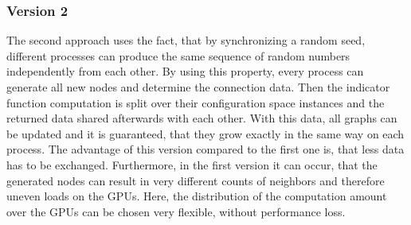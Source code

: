 \documentclass[twocolumn]{svjour3}
\begin{document}
\subsubsection*{Version 2}
The second approach uses the fact, that by synchronizing a random seed, 
different processes can produce the same sequence of random numbers independently from each other.
By using this property, every process can generate all new nodes and determine the connection data. 
Then the indicator function computation is split over their configuration space instances and the returned data shared afterwards with each other.
With this data, all graphs can be updated and it is guaranteed, that they grow exactly in the same way on each process.
The advantage of this version compared to the first one is, that less data has to be exchanged. 
Furthermore, in the first version it can occur, that the generated nodes can result in very different counts of neighbors and therefore uneven loads on the GPUs.
Here, the distribution of the computation amount over the GPUs can be chosen very flexible, without performance loss.
\end{document}
